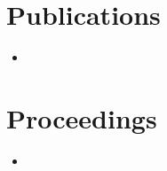 \documentclass[letterpaper,11pt]{article}
\newcommand{\Section}[2]{
    \section{\texorpdfstring{#1}{o} #2}
}
\begin{document}

\Section{\faPencilSquareO}{Publications}
  \begin{itemize}
      \item {}
  \end{itemize}

\Section{\faArchive}{Proceedings}
  \begin{itemize}
      \item {}
  \end{itemize}
  
\end{document}
